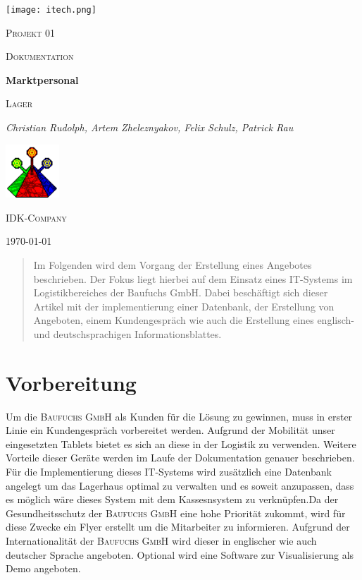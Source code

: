 \documentclass{article}
\begin{document}
\begin{titlepage}
	\centering
	\texttt{[image: itech.png]}\par\vspace{1cm}
	{\scshape\LARGE Projekt 01 \par}
	\vspace{1cm}
	{\scshape\small Dokumentation\par}
	\vspace{1.5cm}
	{\huge\bfseries Marktpersonal \par}
    \vspace{0.5cm}
    {\scshape\small Lager \par}
	
	\vspace{2cm}
	{\Large\itshape Christian Rudolph, Artem Zheleznyakov, Felix Schulz, Patrick Rau\par}
    \vspace{5cm}
    \includegraphics[width=0.15\textwidth]{idk-tower.png}\par\vspace{0.15cm}
    \textsc{IDK-Company}
	\vfill
	{\large \today\par}
\end{titlepage}
\tableofcontents
\listoffigures
\newpage
\begin{abstract}
Im Folgenden wird dem Vorgang der Erstellung eines Angebotes beschrieben. Der Fokus liegt hierbei auf dem Einsatz eines IT-Systems im Logistikbereiches der Baufuchs GmbH. Dabei beschäftigt sich dieser Artikel mit der implementierung einer Datenbank, der Erstellung von Angeboten, einem Kundengespräch wie auch die Erstellung eines englisch- und deutschsprachigen Informationsblattes.
\end{abstract}


\section{Vorbereitung}
Um die \textsc{Baufuchs GmbH} als Kunden für die Lösung zu gewinnen, muss in erster Linie ein Kundengespräch vorbereitet werden. Aufgrund der Mobilität unser eingesetzten Tablets bietet es sich an diese in der Logistik zu verwenden. Weitere Vorteile dieser Geräte werden im Laufe der Dokumentation genauer beschrieben. \newline
Für die Implementierung dieses IT-Systems wird zusätzlich eine Datenbank angelegt um das Lagerhaus optimal zu verwalten und es soweit anzupassen, dass es möglich wäre dieses System mit dem Kassesnsystem zu verknüpfen.\newline\newline Da der Gesundheitsschutz der \textsc{Baufuchs GmbH} eine hohe Priorität zukommt, wird für diese Zwecke ein Flyer erstellt um die Mitarbeiter zu informieren. Aufgrund der Internationalität der \textsc{Baufuchs GmbH} wird dieser in englischer wie auch deutscher Sprache angeboten.\newline
Optional wird eine Software zur Visualisierung als Demo angeboten.
\end{document}
